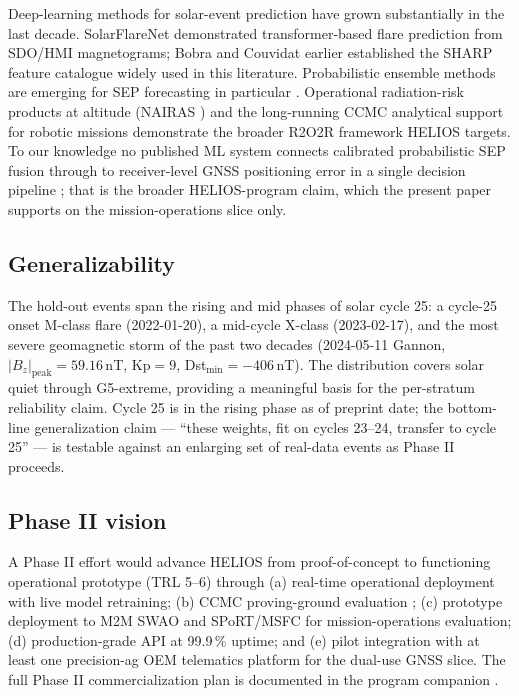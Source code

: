 \documentclass[11pt,letterpaper]{article}
\begin{document}
Deep-learning methods for solar-event prediction have grown substantially in
the last decade.  SolarFlareNet \cite{sun2023} demonstrated transformer-based
flare prediction from SDO/HMI magnetograms; Bobra and Couvidat
\cite{bobra2015} earlier established the SHARP feature catalogue widely used
in this literature.  Probabilistic ensemble methods are emerging for SEP
forecasting in particular \cite{poduval2023}.  Operational radiation-risk
products at altitude (NAIRAS \cite{mertens2025}) and the long-running
CCMC analytical support for robotic missions \cite{colladovega2023}
demonstrate the broader R2O2R framework HELIOS targets.  To our knowledge
no published ML system connects calibrated probabilistic SEP fusion through
to receiver-level GNSS positioning error in a single decision pipeline
\cite{ntrs_brazil2025,seesaw2022}; that is the broader HELIOS-program
claim, which the present paper supports on the mission-operations slice
only.

\subsection{Generalizability}

The hold-out events span the rising and mid phases of solar cycle 25:
a cycle-25 onset M-class flare (2022-01-20), a mid-cycle X-class
(2023-02-17), and the most severe geomagnetic storm of the past two
decades (2024-05-11 Gannon, $|B_z|_\mathrm{peak} = 59.16$\,nT,
Kp$=$9, Dst$_\mathrm{min}=-406$\,nT).  The distribution covers solar quiet
through G5-extreme, providing a meaningful basis for the per-stratum
reliability claim.  Cycle 25 is in the rising phase as of preprint date;
the bottom-line generalization claim --- ``these weights, fit on cycles
23--24, transfer to cycle 25'' --- is testable against an enlarging set
of real-data events as Phase II proceeds.

\subsection{Phase II vision}

A Phase II effort would advance HELIOS from proof-of-concept to functioning
operational prototype (TRL 5--6) through (a) real-time operational
deployment with live model retraining; (b) CCMC proving-ground evaluation
\cite{whitman2023,whitman2024}; (c) prototype deployment to M2M SWAO
\cite{m2mswao} and SPoRT/MSFC for mission-operations evaluation;
(d) production-grade API at 99.9\,\% uptime; and (e) pilot integration
with at least one precision-ag OEM telematics platform for the dual-use
GNSS slice.  The full Phase II commercialization plan is documented in
the program companion \cite{helios_program}.
\end{document}
